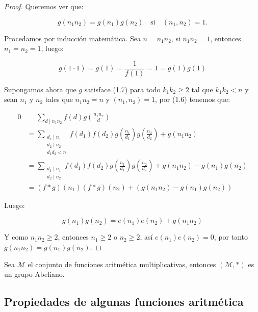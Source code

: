 \begin{proof}
Queremos ver que:

\begin{equation}
g(n_1n_2)=g(n_1)g(n_2) \quad \text{si} \quad (n_1,n_2)=1.
\end{equation}

Procedamos por inducción matemática. Sea $n=n_1 n_2$, si $n_1 n_2=1$, entonces $n_1=n_2=1$, luego:

$$g(1\cdot 1)=g(1)=\dfrac{1}{f(1)}=1=g(1)g(1)$$

Supongamos ahora que $g$ satisface (1.7) para todo $k_1k_2\geq 2$ tal que $k_1k_2<n$ y sean $n_1$ y $n_2$ tales que $n_1n_2=n$ y $(n_1,n_2)=1$, por (1.6) tenemos que:

$$
\begin{aligned}
0 & =\sum_{d \mid n_1 n_2} f(d) g\left(\frac{n_1n_2}{d}\right) \\
&=\sum_{\substack{d_1 \mid n_1 \\
d_2\mid n_2\\ d_1d_2<n}} f(d_1)f(d_2) g \left( \frac{n_1}{d_1} \right)g \left( \frac{n_2}{d_2} \right)+ g(n_1n_2)\\
&=\sum_{\substack{d_1 \mid n_1 \\
d_2\mid n_2}} f(d_1)f(d_2) g \left( \frac{n_1}{d_1} \right)g \left( \frac{n_2}{d_2} \right)+ g(n_1n_2)-g(n_1)g(n_2)\\
& =(f * g)\left(n_1\right)(f * g)\left(n_2\right)+\left(g\left(n_1 n_2\right)-g\left(n_1\right) g\left(n_2\right)\right)
\end{aligned}
$$

Luego:

$$g\left(n_1\right) g\left(n_2\right)=e\left(n_1\right) e\left(n_2\right)+g\left(n_1 n_2\right)$$

\vspace*{0.2cm}

Y como $n_1n_2\geq 2$, entonces $n_1\geq 2$ o $n_2\geq 2$, así $e(n_1)e(n_2)=0$, por tanto $g(n_1n_2)=g(n_1)g(n_2)$.
\end{proof}

\begin{corollary}
Sea $\mathcal{M}$ el conjunto de funciones aritmética multiplicativas, entonces $(\mathcal{M},*)$ es un grupo Abeliano.
\end{corollary}

\subsection{Propiedades de algunas funciones aritmética}

